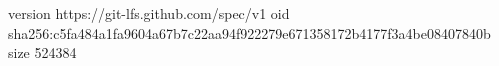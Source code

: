 version https://git-lfs.github.com/spec/v1
oid sha256:c5fa484a1fa9604a67b7c22aa94f922279e671358172b4177f3a4be08407840b
size 524384
